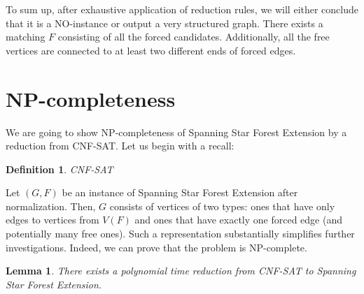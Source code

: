 \documentclass[en]{pracamgr}
\newtheorem{definition}{Definition}
\newtheorem{lemma}{Lemma}
\newcommand{\ssfep}{{\sc Spanning Star Forest Extension}}
\newcommand{\cnfsat}{{\sc CNF-SAT}}
\begin{document}
To sum up, after exhaustive application of reduction rules, we will either conclude that it is a NO-instance or output a very structured graph. There exists a matching $F$ consisting of all the forced candidates. Additionally, all the free vertices are connected to at least two different ends of forced edges.

\section{NP-completeness}

We are going to show NP-completeness of \ssfep{} by a reduction from \cnfsat{}. Let us begin with a recall:

\begin{definition}
	CNF-SAT
\end{definition}

Let $(G,F)$ be an instance of \ssfep{} after normalization. Then, $G$ consists of vertices of two types: ones that have only edges to vertices from $V(F)$ and ones that have exactly one forced edge (and potentially many free ones). Such a representation substantially simplifies further investigations. Indeed, we can prove that the problem is NP-complete.

\begin{lemma}\label{ssfep reduction}
	There exists a polynomial time reduction from \cnfsat{} to \ssfep{}.
\end{lemma}
\end{document}
